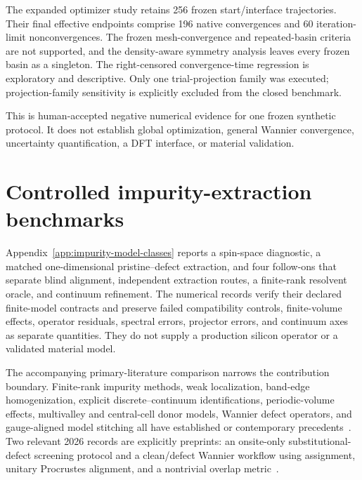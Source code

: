 The expanded optimizer study retains 256 frozen start/interface trajectories.
Their final effective endpoints comprise 196 native convergences and 60
iteration-limit nonconvergences. The frozen mesh-convergence and repeated-basin
criteria are not supported, and the density-aware symmetry analysis leaves
every frozen basin as a singleton. The right-censored convergence-time
regression is exploratory and descriptive. Only one trial-projection family
was executed; projection-family sensitivity is explicitly excluded from the
closed benchmark.

This is human-accepted negative numerical evidence for one frozen synthetic
protocol. It does not establish global optimization, general Wannier
convergence, uncertainty quantification, a DFT interface, or material
validation.

\section{Controlled impurity-extraction benchmarks}


Appendix~\ref{app:impurity-model-classes} reports a spin-space diagnostic, a
matched one-dimensional pristine--defect extraction, and four follow-ons that
separate blind alignment, independent extraction routes, a finite-rank
resolvent oracle, and continuum refinement. The numerical records verify their
declared finite-model contracts and preserve failed compatibility controls,
finite-volume effects, operator residuals, spectral errors, projector errors,
and continuum axes as separate quantities. They do not supply a production
silicon operator or a validated material model.

The accompanying primary-literature comparison narrows the contribution
boundary. Finite-rank impurity methods, weak localization, band-edge
homogenization, explicit discrete--continuum identifications, periodic-volume
effects, multivalley and central-cell donor models, Wannier defect operators,
and gauge-aligned model stitching all have established or contemporary
precedents~\cite{kosterSlater1954impurity,simon1976weak,parzygnat2010,hoeferWeinstein2011,ducheneVukicevicWeinstein2015,nakamuraTadano2021,koenigLeeHammer2011,kohnLuttinger1955donor,gamble2015,berlijnVoljaKu2011,corsettiMostofi2011,lihmPark2019,luParkZhouBernardi2020}.
Two relevant 2026 records are explicitly preprints: an onsite-only
substitutional-defect screening protocol and a clean/defect Wannier workflow
using assignment, unitary Procrustes alignment, and a nontrivial overlap
metric~\cite{kangMuechler2026,shiXieZhangChuGong2026}.

